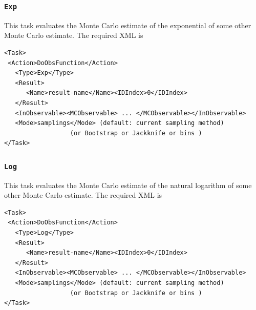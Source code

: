 \documentclass[12pt]{article}
\newcommand{\vb}{\texttt}
\begin{document}
\subsubsection{\vb{Exp}}                                                                        
This task evaluates the Monte Carlo estimate of the                                    
exponential of some other Monte Carlo estimate.  The
required XML is
\begin{verbatim}
<Task>                                                                   
 <Action>DoObsFunction</Action>                                          
   <Type>Exp</Type>                                                      
   <Result>                                                              
      <Name>result-name</Name><IDIndex>0</IDIndex>                       
   </Result>                                                             
   <InObservable><MCObservable> ... </MCObservable></InObservable>       
   <Mode>samplings</Mode> (default: current sampling method)             
                  (or Bootstrap or Jackknife or bins )                   
</Task>                                                                  
\end{verbatim}

\subsubsection{\vb{Log}}                                                         
This task evaluates the Monte Carlo estimate of the                                    
natural logarithm of some other Monte Carlo estimate.  The
required XML is
\begin{verbatim}
<Task>                                                                   
 <Action>DoObsFunction</Action>                                          
   <Type>Log</Type>                                                      
   <Result>                                                              
      <Name>result-name</Name><IDIndex>0</IDIndex>                       
   </Result>                                                             
   <InObservable><MCObservable> ... </MCObservable></InObservable>       
   <Mode>samplings</Mode> (default: current sampling method)             
                  (or Bootstrap or Jackknife or bins )                   
</Task>                                                                  
\end{verbatim}
\end{document}
